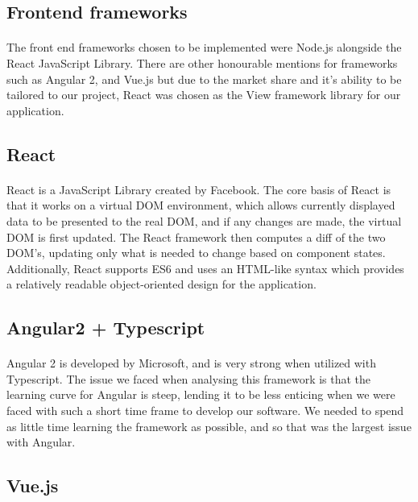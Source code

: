 \documentclass[12pt]{article}
\begin{document}
	\subsection{Frontend frameworks}
	\paragraph{}
		The front end frameworks chosen to be implemented were Node.js alongside the React JavaScript Library. There are other honourable mentions for frameworks such as Angular 2, and Vue.js but due to the market share and it's ability to be tailored to our project, React was chosen as the View framework library for our application. 
		
	\subsection{React}
	\paragraph{}
		React is a JavaScript Library created by Facebook. The core basis of React is that it works on a virtual DOM environment, which allows currently displayed data to be presented to the real DOM, and if any changes are made, the virtual DOM is first updated. The React framework then computes a diff of the two DOM's, updating only what is needed to change based on component states. Additionally, React supports ES6 and uses an HTML-like syntax which provides a relatively readable object-oriented design for the application. 
	
	\subsection{Angular2 + Typescript}
	\paragraph{}
		Angular 2 is developed by Microsoft, and is very strong when utilized with Typescript. The issue we faced when analysing this framework is that the learning curve for Angular is steep, lending it to be less enticing when we were faced with such a short time frame to develop our software. We needed to spend as little time learning the framework as possible, and so that was the largest issue with Angular.
	
	\subsection{Vue.js}
\end{document}
